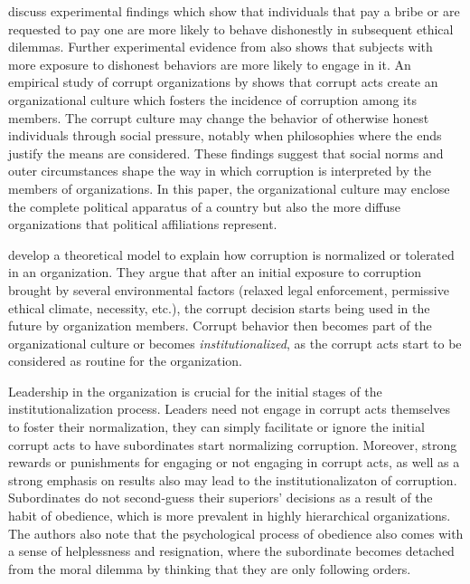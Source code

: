 \documentclass[12pt,a4]{article}\usepackage[]{graphicx}\usepackage[]{xcolor}
\begin{document}
\textcite{Ariely.2019} discuss experimental findings which show that individuals that pay a bribe or are requested to pay one are more likely to behave dishonestly in subsequent ethical dilemmas. Further experimental evidence from \textcite{Gino.2009} also shows that subjects with more exposure to dishonest behaviors are more likely to engage in it. An empirical study of corrupt organizations by \textcite{Campbell.2014} shows that corrupt acts create an organizational culture which fosters the incidence of corruption among its members. The corrupt culture may change the behavior of otherwise honest individuals through social pressure, notably when philosophies where the ends justify the means are considered. These findings suggest that social norms and outer circumstances shape the way in which corruption is interpreted by the members of organizations. In this paper, the organizational culture may enclose the complete political apparatus of a country but also the more diffuse organizations that political affiliations represent. 

\textcite{Ashforth.2003} develop a theoretical model to explain how corruption is normalized or tolerated in an organization. They argue that after an initial exposure to corruption brought by several environmental factors (relaxed legal enforcement, permissive ethical climate, necessity, etc.), the corrupt decision starts being used in the future by organization members. Corrupt behavior then becomes part of the organizational culture or becomes \textit{institutionalized}, as the corrupt acts start to be considered as routine for the organization.  

Leadership in the organization is crucial for the initial stages of the institutionalization process. Leaders need not engage in corrupt acts themselves to foster their normalization, they can simply facilitate or ignore the initial corrupt acts to have subordinates start normalizing corruption. Moreover, strong rewards or punishments for engaging or not engaging in corrupt acts, as well as a strong emphasis on results also may lead to the institutionalizaton of corruption. Subordinates do not second-guess their superiors' decisions as a result of the habit of obedience, which is more prevalent in highly hierarchical organizations. The authors also note that the psychological process of obedience also comes with a sense of helplessness and resignation, where the subordinate becomes detached from the moral dilemma by thinking that they are only following orders. 
\end{document}
